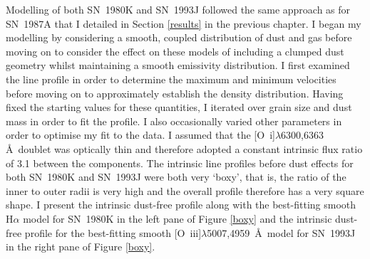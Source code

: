 Modelling of both SN~1980K and SN~1993J followed the same approach as for SN~1987A that I detailed in Section \ref{results} in the previous chapter.  I began my modelling by considering a smooth, coupled distribution of dust and gas before moving on to consider the effect on these models of including a clumped dust geometry whilst maintaining a smooth emissivity distribution.  I first examined the line profile in order to determine the maximum and minimum velocities before moving on to approximately establish the density distribution.  Having fixed the starting values for these quantities, I iterated over grain size and dust mass in order to fit the profile.  I also occasionally  varied other parameters in order to optimise my fit to the data. I assumed that the [O~{\sc i}]$\lambda$6300,6363 \AA\  doublet was optically thin and therefore adopted a constant intrinsic flux ratio of 3.1 between the components.  The intrinsic line profiles before dust effects for both SN~1980K and SN~1993J were both very `boxy', that is, the ratio of the inner to outer radii is very high and the overall profile therefore has a very square shape.  I present the intrinsic dust-free profile along with the best-fitting smooth H$\alpha$ model for SN~1980K in the left pane of Figure \ref{boxy} and the intrinsic dust-free profile for the best-fitting smooth [O~{\sc iii}]$\lambda$5007,4959~\AA\ model for SN~1993J in the right pane of Figure \ref{boxy}.

